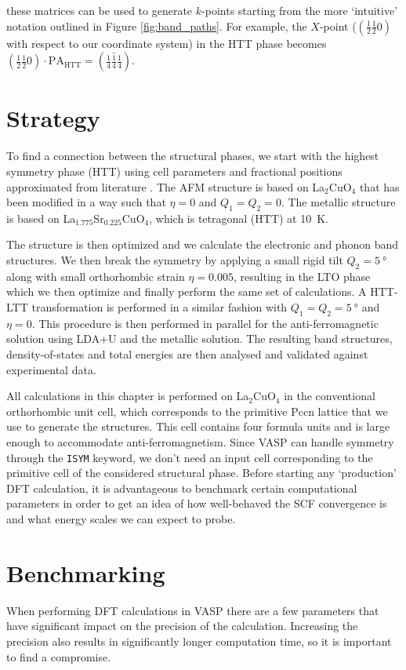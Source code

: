\noindent these matrices can be used to generate $k$-points starting from the more `intuitive' notation outlined in Figure \ref{fig:band_paths}. For example, the $X$-point ($(\frac{1}{2} \frac{1}{2} 0)$ with respect to our coordinate system) in the HTT phase becomes $(\frac{1}{2} \frac{1}{2} 0) \cdot \text{PA}_\text{HTT} = (\frac{1}{4} \bar{\frac{1}{4}} \frac{1}{4})$.

\section{Strategy}
To find a connection between the structural phases, we start with the highest symmetry phase (HTT) using cell parameters and fractional positions approximated from literature \cite{Radaelli1994a}. The AFM structure is based on La$_2$CuO$_4$ that has been modified in a way such that $\eta=0$ and $Q_1 = Q_2 = 0$. The metallic structure is based on La$_{1.775}$Sr$_{0.225}$CuO$_4$, which is tetragonal (HTT) at \SI{10}{\kelvin}.

The structure is then optimized and we calculate the electronic and phonon band structures. We then break the symmetry by applying a small rigid tilt $Q_2 = \SI{5}{\degree}$ along with small orthorhombic strain $\eta = 0.005$, resulting in the LTO phase which we then optimize and finally perform the same set of calculations. A HTT-LTT transformation is performed in a similar fashion with $Q_1 = Q_2 = \SI{5}{\degree}$ and $\eta = 0$. This procedure is then performed in parallel for the anti-ferromagnetic solution using LDA+U and the metallic solution. The resulting band structures, density-of-states and total energies are then analysed and validated against experimental data. 

All calculations in this chapter is performed on La$_2$CuO$_4$ in the conventional orthorhombic unit cell, which corresponds to the primitive Pccn lattice that we use to generate the structures. This cell contains four formula units and is large enough to accommodate anti-ferromagnetism. Since VASP can handle symmetry through the \texttt{ISYM} keyword, we don't need an input cell corresponding to the primitive cell of the considered structural phase. Before starting any `production' DFT calculation, it is advantageous to benchmark certain computational parameters in order to get an idea of how well-behaved the SCF convergence is and what energy scales we can expect to probe.

\section{Benchmarking}
When performing DFT calculations in VASP there are a few parameters that have significant impact on the precision of the calculation. Increasing the precision also results in significantly longer computation time, so it is important to find a compromise. 

